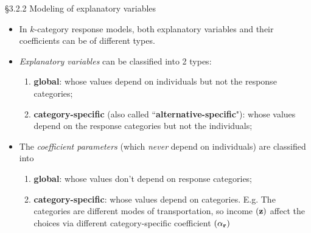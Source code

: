 \documentclass{beamer}
\newenvironment{wideitemize}%
  {\begin{itemize}%
    \setlength{\parskip}{1em}}%
  {\end{itemize}}
\begin{document}
\begin{frame}{\S3.2.2 Modeling of explanatory variables}
\begin{wideitemize}
\item 
In $k$-category response models, both explanatory variables and their coefficients
 can be of different types.


\item
 \textit{Explanatory variables} can be classified into 2 types:
\begin{enumerate}
\item
\textbf{global}: whose values depend on individuals but not the response categories;
\item
\textbf{category-specific} (also called ``{\bf alternative-specific}"): whose values depend on the response categories but not the individuals;
\end{enumerate}

\item
The \textit{coefficient parameters} (which \emph{never} depend on individuals) are classified into
\begin{enumerate}
\item
\textbf{global}: whose values don't depend on response categories;
\item
\textbf{category-specific}: whose values depend on categories. E.g. The categories are different modes of transportation, so income $(\bf z)$ affect the choices via different category-specific coefficient $(\bf \alpha_r)$
\end{enumerate}

\end{wideitemize}
\end{frame}

%
%
%
%



%
\end{document}
